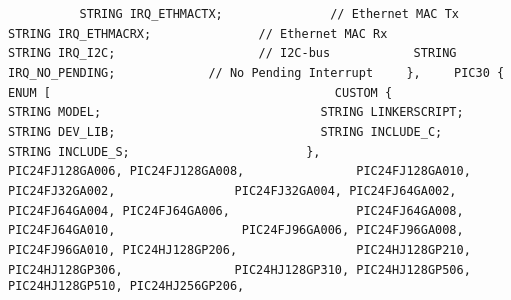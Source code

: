 {{{{\lstinline!          STRING IRQ_ETHMACTX;               // Ethernet MAC Tx ! \newline
\lstinline!          STRING IRQ_ETHMACRX;               // Ethernet MAC Rx ! \newline
\lstinline!          STRING IRQ_I2C;                    // I2C-bus ! \newline
\lstinline!          STRING IRQ_NO_PENDING;             // No Pending Interrupt! \newline
\lstinline!	   },! \newline
\lstinline!	   PIC30 {                                ! \newline
\lstinline!	     ENUM [                               ! \newline
\lstinline!	       CUSTOM {                           ! \newline
\lstinline!	         STRING MODEL;                    ! \newline
\lstinline!	         STRING LINKERSCRIPT;             ! \newline
\lstinline!	         STRING DEV_LIB;                  ! \newline
\lstinline!	         STRING INCLUDE_C;                ! \newline
\lstinline!	         STRING INCLUDE_S;                ! \newline
\lstinline!	       },                                 ! \newline
\lstinline!             PIC24FJ128GA006, PIC24FJ128GA008,  ! \newline
\lstinline!             PIC24FJ128GA010, PIC24FJ32GA002,   ! \newline
\lstinline!             PIC24FJ32GA004, PIC24FJ64GA002,    ! \newline
\lstinline!             PIC24FJ64GA004, PIC24FJ64GA006,    ! \newline
\lstinline!             PIC24FJ64GA008, PIC24FJ64GA010,    ! \newline
\lstinline!             PIC24FJ96GA006, PIC24FJ96GA008,    ! \newline
\lstinline!             PIC24FJ96GA010, PIC24HJ128GP206,   ! \newline
\lstinline!             PIC24HJ128GP210, PIC24HJ128GP306,  ! \newline
\lstinline!             PIC24HJ128GP310, PIC24HJ128GP506,  ! \newline
\lstinline!             PIC24HJ128GP510, PIC24HJ256GP206,  ! \newline
}}}}
